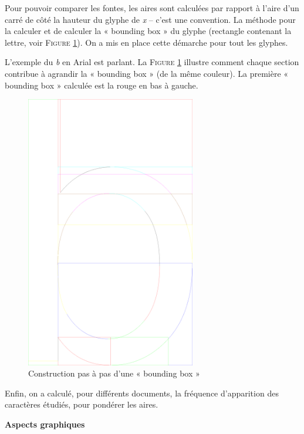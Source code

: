 \documentclass[10pt,twoside,french,a4paper]{article}
\begin{document}
\medskip

Pour pouvoir comparer les fontes, les  aires sont calculées par rapport à l'aire d'un carré de côté la hauteur du glyphe de \emph{x} -- c'est une convention.
La méthode pour la calculer et de calculer la « bounding box » du glyphe (rectangle contenant la lettre, voir \textsc{Figure} \ref{Bounding box b}). On a mis en place cette démarche pour tout les glyphes.

L'exemple du \emph{b} en Arial est parlant. La \textsc{Figure} \ref{Bounding box b} illustre comment chaque section contribue à agrandir la « bounding box » (de la même couleur). La première « bounding box » calculée est la rouge en bas à gauche.

\begin{figure}[h]
  \begin{center}
    \includegraphics[height=12cm]{Ressources/pdf/b3.pdf}
    \caption{Construction pas à pas d'une « bounding box »}
    \label{Bounding box b}
  \end{center}
\end{figure}

\medskip

Enfin, on a calculé, pour différents documents, la fréquence d'apparition des caractères étudiés, pour pondérer les aires.

\medskip

\newpage

\noindent \textbf{Aspects graphiques}
\end{document}
